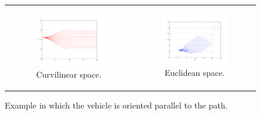 \begin{figure}[h!]
\centering
\begin{tabular}{cc}
  \begin{subfigure}[b]{0.45\textwidth}
    \centering
    \includegraphics[width=\textwidth, trim=50 40 80 60,clip]{frenet0}
    \caption{Curvilinear space.}
    \label{fig:cp07_frenet0}
  \end{subfigure} &
  \begin{subfigure}[b]{0.45\textwidth}
    \centering
    \includegraphics[width=\textwidth, trim=50 40 80 60,clip]{cartesian0}
    \caption{Euclidean space.}
    \label{fig:cp07_cartesian0}
  \end{subfigure}%
\end{tabular}
\caption{Example in which the vehicle is oriented parallel to the path.}\label{fig:cp07_frenet0}
\end{figure}

